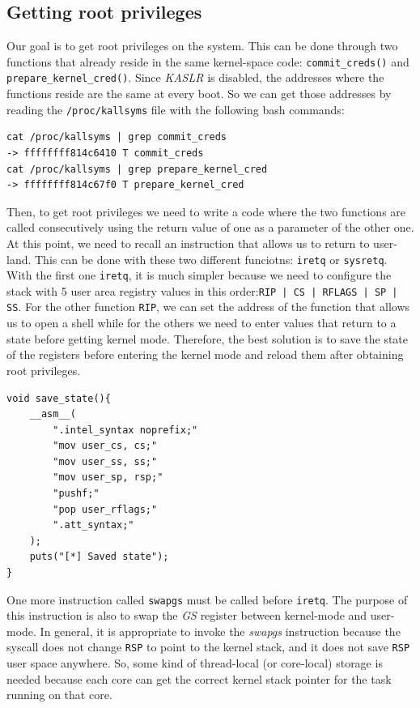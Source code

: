 \documentclass{masterthesis}
\begin{document}
\subsection{Getting root privileges}
\label{subsect:get privileges}
Our goal is to get root privileges on the system.
This can be done through two functions that already reside in the same kernel-space code: \texttt{commit\_creds()} and \texttt{prepare\_kernel\_cred()}.
Since \emph{KASLR} is disabled, the addresses where the functions reside are the same at every boot. So we can get those addresses by reading the \texttt{/proc/kallsyms} file with the following bash commands:
\begin{lstlisting}
cat /proc/kallsyms | grep commit_creds
-> ffffffff814c6410 T commit_creds
cat /proc/kallsyms | grep prepare_kernel_cred
-> ffffffff814c67f0 T prepare_kernel_cred
\end{lstlisting}
Then, to get root privileges we need to write a code where the two functions are called consecutively using the return value of one as a parameter of the other one.
At this point, we need to recall an instruction that allows us to return to user-land.
This can be done with these two different funciotns: \texttt{iretq} or \texttt{sysretq}.
With the first one \texttt{iretq}, it is much simpler because we need to configure the stack with 5 user area registry values in this order:\texttt{RIP | CS | RFLAGS | SP | SS}.
For the other function \texttt{RIP}, we can set the address of the function that allows us to open a shell while for the others we need to enter values that return to a state before getting kernel mode.
Therefore, the best solution is to save the state of the registers before entering the kernel mode and reload them after obtaining root privileges.
\begin{lstlisting}
void save_state(){
    __asm__(
        ".intel_syntax noprefix;"
        "mov user_cs, cs;"
        "mov user_ss, ss;"
        "mov user_sp, rsp;"
        "pushf;"
        "pop user_rflags;"
        ".att_syntax;"
    );
    puts("[*] Saved state");
}
\end{lstlisting}
One more instruction called \texttt{swapgs} must be called before \texttt{iretq}. The purpose of this instruction is also to swap the \textit{GS} register between kernel-mode and user-mode.
In general, it is appropriate to invoke the \emph{swapgs} instruction because the syscall does not change \texttt{RSP} to point to the kernel stack, and it does not save \texttt{RSP} user space anywhere. So, some kind of thread-local (or core-local) storage is needed because each core can get the correct kernel stack pointer for the task running on that core.
\end{document}
